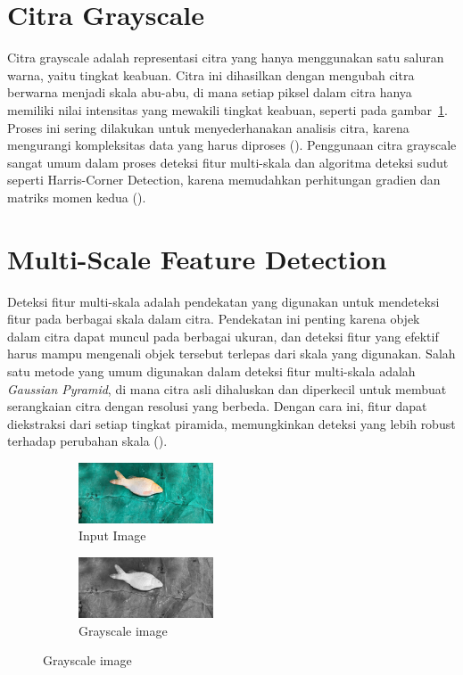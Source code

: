 \section{Citra Grayscale}
  Citra grayscale adalah representasi citra yang hanya menggunakan satu saluran warna, yaitu tingkat keabuan. Citra ini dihasilkan dengan mengubah citra berwarna menjadi skala abu-abu, di mana setiap piksel dalam citra hanya memiliki nilai intensitas yang mewakili tingkat keabuan, seperti pada gambar~\ref{fig:grayscale}. Proses ini sering dilakukan untuk menyederhanakan analisis citra, karena mengurangi kompleksitas data yang harus diproses (\cite[hlm. 27--32]{Gonzalez2018}). 
  Penggunaan citra grayscale sangat umum dalam proses deteksi fitur multi-skala dan algoritma deteksi sudut seperti Harris-Corner Detection, karena memudahkan perhitungan gradien dan matriks momen kedua (\cite[hlm. 307--308]{Sanchez2018}).

\section{Multi-Scale Feature Detection}
  Deteksi fitur multi-skala adalah pendekatan yang digunakan untuk mendeteksi fitur pada berbagai skala dalam citra. Pendekatan ini penting karena objek dalam citra dapat muncul pada berbagai ukuran, dan deteksi fitur yang efektif harus mampu mengenali objek tersebut terlepas dari skala yang digunakan. Salah satu metode yang umum digunakan dalam deteksi fitur multi-skala adalah \emph{Gaussian Pyramid}, di mana citra asli dihaluskan dan diperkecil untuk membuat serangkaian citra dengan resolusi yang berbeda. Dengan cara ini, fitur dapat diekstraksi dari setiap tingkat piramida, memungkinkan deteksi yang lebih robust terhadap perubahan skala (\cite[hlm. 91--92]{Lowe2004}).
\begin{figure}
	\centering
	\begin{subfigure}{.3\textwidth}
		\centering
        \includegraphics[keepaspectratio, width=4cm]{gambar/IMG_20240121_131125.jpg}
		\caption{Input Image}
    \end{subfigure}

	\begin{subfigure}{.3\textwidth}
		\centering
		\includegraphics[keepaspectratio, width=4cm]{gambar/IMG_20240121_131125 copy.jpg}
		\caption{Grayscale image}
	\end{subfigure} 

\caption{Grayscale image}\label{fig:grayscale}
\end{figure}

